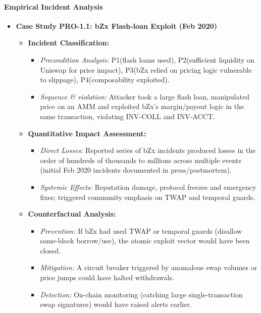 \paragraph{Empirical Incident Analysis}

\begin{itemize}
    \item \textbf{Case Study PRO-1.1: bZx Flash-loan Exploit (Feb 2020)}
    \begin{itemize}
        \item \textbf{Incident Classification:}
            \begin{itemize}
                \item \textit{Precondition Analysis:} P1\checkmark (flash loans used), P2\checkmark (sufficient liquidity on Uniswap for price impact), P3\checkmark (bZx relied on pricing logic vulnerable to slippage), P4\checkmark (composability exploited).
                \item \textit{Sequence \& violation:} Attacker took a large flash loan, manipulated price on an AMM and exploited bZx's margin/payout logic in the same transaction, violating INV-COLL and INV-ACCT.
            \end{itemize}
        \item \textbf{Quantitative Impact Assessment:}
            \begin{itemize}
                \item \textit{Direct Losses:} Reported series of bZx incidents produced losses in the order of hundreds of thousands to millions across multiple events (initial Feb 2020 incidents documented in press/postmortem).
                \item \textit{Systemic Effects:} Reputation damage, protocol freezes and emergency fixes; triggered community emphasis on TWAP and temporal guards.
            \end{itemize}
        \item \textbf{Counterfactual Analysis:}
            \begin{itemize}
                \item \textit{Prevention:} If bZx had used TWAP or temporal guards (disallow same-block borrow/use), the atomic exploit vector would have been closed.
                \item \textit{Mitigation:} A circuit breaker triggered by anomalous swap volumes or price jumps could have halted withdrawals.
                \item \textit{Detection:} On-chain monitoring (catching large single-transaction swap signatures) would have raised alerts earlier.

\end{itemize}
\end{itemize}
\end{itemize}

